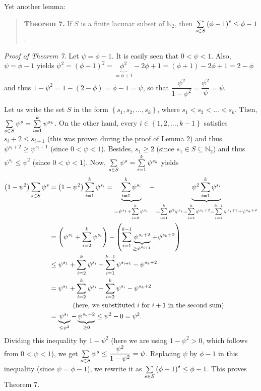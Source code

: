 \documentclass[numbers=enddot,12pt,final,onecolumn,notitlepage]{scrartcl}%
\numberwithin{exer}{section}
\theoremstyle{definition}
\let\sumnonlimits\sum
\renewcommand{\sum}{\sumnonlimits\limits}
\begin{document}
Yet another lemma:

\begin{quote}
\textbf{Theorem 7.} If $S$ is a finite lacunar subset of $\mathbb{N}_{2}$,
then $\sum\limits_{s\in S}\left(  \phi-1\right)  ^{s}\leq\phi-1$.
\end{quote}

\textit{Proof of Theorem 7.} Let $\psi=\phi-1$. It is easily seen that
$0<\psi<1$. Also, $\psi=\phi-1$ yields $\psi^{2}=\left(  \phi-1\right)
^{2}=\underbrace{\phi^{2}}_{=\phi+1}-2\phi+1=\left(  \phi+1\right)
-2\phi+1=2-\phi$ and thus $1-\psi^{2}=1-\left(  2-\phi\right)  =\phi-1=\psi$,
so that $\dfrac{\psi^{2}}{1-\psi^{2}}=\dfrac{\psi^{2}}{\psi}=\psi$.

Let us write the set $S$ in the form $\left\{  s_{1},s_{2},...,s_{k}\right\}
$, where $s_{1}<s_{2}<...<s_{k}$. Then, $\sum\limits_{s\in S}\psi^{s}%
=\sum\limits_{i=1}^{k}\psi^{s_{k}}$. On the other hand, every $i\in\left\{
1,2,...,k-1\right\}  $ satisfies $s_{i}+2\leq s_{i+1}$ (this was proven during
the proof of Lemma 2) and thus $\psi^{s_{i}+2}\geq\psi^{s_{i}+1}$ (since
$0<\psi<1$). Besides, $s_{1}\geq2$ (since $s_{1}\in S\subseteq\mathbb{N}_{2}$)
and thus $\psi^{s_{1}}\leq\psi^{2}$ (since $0<\psi<1$). Now, $\sum
\limits_{s\in S}\psi^{s}=\sum\limits_{i=1}^{k}\psi^{s_{k}}$ yields%
\begin{align*}
\left(  1-\psi^{2}\right)  \sum\limits_{s\in S}\psi^{s}  &  =\left(
1-\psi^{2}\right)  \sum\limits_{i=1}^{k}\psi^{s_{i}}=\underbrace{\sum
\limits_{i=1}^{k}\psi^{s_{i}}}_{=\psi^{s_{1}}+\sum\limits_{i=2}^{k}\psi
^{s_{i}}}-\underbrace{\psi^{2}\sum\limits_{i=1}^{k}\psi^{s_{i}}}%
_{=\sum\limits_{i=1}^{k}\psi^{2}\psi^{s_{i}}=\sum\limits_{i=1}^{k}\psi
^{s_{i}+2}=\sum\limits_{i=1}^{k-1}\psi^{s_{i}+2}+\psi^{s_{k}+2}}\\
&  =\left(  \psi^{s_{1}}+\sum\limits_{i=2}^{k}\psi^{s_{i}}\right)  -\left(
\sum\limits_{i=1}^{k-1}\underbrace{\psi^{s_{i}+2}}_{\geq\psi^{s_{i+1}}}%
+\psi^{s_{k}+2}\right) \\
&  \leq\psi^{s_{1}}+\sum\limits_{i=2}^{k}\psi^{s_{i}}-\sum\limits_{i=1}%
^{k-1}\psi^{s_{i+1}}-\psi^{s_{k}+2}\\
&  =\psi^{s_{1}}+\sum\limits_{i=2}^{k}\psi^{s_{i}}-\sum\limits_{i=2}^{k}%
\psi^{s_{i}}-\psi^{s_{k}+2}\\
&  \ \ \ \ \ \ \ \ \ \ \left(  \text{here, we substituted }i\text{ for
}i+1\text{ in the second sum}\right) \\
&  =\underbrace{\psi^{s_{1}}}_{\leq\psi^{2}}-\underbrace{\psi^{s_{k}+2}}%
_{\geq0}\leq\psi^{2}-0=\psi^{2}.
\end{align*}
Dividing this inequality by $1-\psi^{2}$ (here we are using $1-\psi^{2}>0$,
which follows from $0<\psi<1$), we get $\sum\limits_{s\in S}\psi^{s}\leq
\dfrac{\psi^{2}}{1-\psi^{2}}=\psi$. Replacing $\psi$ by $\phi-1$ in this
inequality (since $\psi=\phi-1$), we rewrite it as $\sum\limits_{s\in
S}\left(  \phi-1\right)  ^{s}\leq\phi-1$. This proves Theorem 7.
\end{document}
